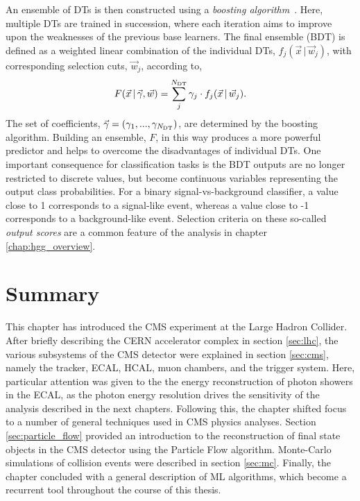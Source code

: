 An ensemble of DTs is then constructed using a \textit{boosting algorithm}~\cite{10.1214/aos/1024691079,10.1214/aos/1013203451}. Here, multiple DTs are trained in succession, where each iteration aims to improve upon the weaknesses of the previous base learners. The final ensemble (BDT) is defined as a weighted linear combination of the individual DTs, $f_j(\vec{x}\,|\,\vec{w}_j)$, with corresponding selection cuts, $\vec{w}_j$, according to,
\begin{equation}
    F(\vec{x}\,|\,\vec{\gamma},\vec{w}) = \sum^{N_{\rm{DT}}}_j \gamma_j \cdot f_j(\vec{x}\,|\,\vec{w}_j).
\end{equation}
\noindent
The set of coefficients, $\vec{\gamma} = (\gamma_1,...,\gamma_{N_{\rm{DT}}})$, are determined by the boosting algorithm. Building an ensemble, $F$, in this way produces a more powerful predictor and helps to overcome the disadvantages of individual DTs. One important consequence for classification tasks is the BDT outputs are no longer restricted to discrete values, but become continuous variables representing the output class probabilities. For a binary signal-vs-background classifier, a value close to 1 corresponds to a signal-like event, whereas a value close to -1 corresponds to a background-like event. Selection criteria on these so-called \textit{output scores} are a common feature of the \Hgg analysis in chapter \ref{chap:hgg_overview}. 

\section{Summary}
This chapter has introduced the CMS experiment at the Large Hadron Collider. After briefly describing the CERN accelerator complex in section \ref{sec:lhc}, the various subsystems of the CMS detector were explained in section \ref{sec:cms}, namely the tracker, ECAL, HCAL, muon chambers, and the trigger system. Here, particular attention was given to the the energy reconstruction of photon showers in the ECAL, as the photon energy resolution drives the sensitivity of the \Hgg analysis described in the next chapters. Following this, the chapter shifted focus to a number of general techniques used in CMS physics analyses. Section \ref{sec:particle_flow} provided an introduction to the reconstruction of final state objects in the CMS detector using the Particle Flow algorithm. Monte-Carlo simulations of collision events were described in section \ref{sec:mc}. Finally, the chapter concluded with a general description of ML algorithms, which become a recurrent tool throughout the course of this thesis.